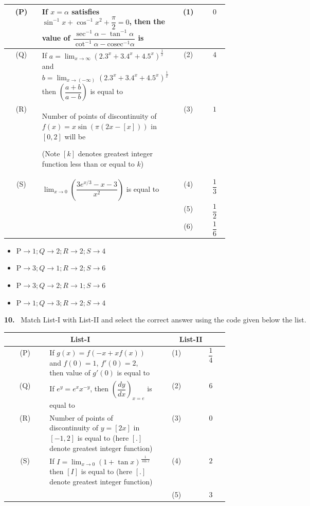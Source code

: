 \documentclass[10pt]{extarticle}
\newcommand{\qn}[1]{\par\smallskip\noindent\textbf{#1.}~}
\newenvironment{qoptions}{\begin{itemize}[leftmargin=1.8em,itemsep=1pt,topsep=2pt,label={}]}{\end{itemize}}
\newcommand{\opt}[2]{\item[(#1)] #2}
\begin{document}
\begin{multicols}{2}
\begin{center}
{\begin{tabular}{|c|p{0.5\linewidth}|c|c|}
(P) & If $x=\alpha$ satisfies $\sin^{-1}x+\cos^{-1}x^2+\dfrac\pi2=0$, then the value of $\dfrac{\sec^{-1}\alpha-\tan^{-1}\alpha}{\cot^{-1}\alpha-\mathrm{cosec}^{-1}\alpha}$ is & (1) & $0$\\\hline
(Q) & If $a=\displaystyle\lim_{x\to\infty}\left(2.3^x+3.4^x+4.5^x\right)^{\frac1x}$ and $b=\displaystyle\lim_{x\to(-\infty)}\left(2.3^x+3.4^x+4.5^x\right)^{\frac1x}$ then $\left(\dfrac{a+b}{a-b}\right)$ is equal to & (2) & $4$\\\hline
(R) & Number of points of discontinuity of $f(x)=x\sin(\pi(2x-[x]))$ in $[0,2]$ will be\par (Note $[k]$ denotes greatest integer function less than or equal to $k$) & (3) & $1$\\\hline
(S) & $\displaystyle\lim_{x\to0}\left(\dfrac{3e^{x/3}-x-3}{x^2}\right)$ is equal to & (4) & $\dfrac13$\\\hline
 & & (5) & $\dfrac12$\\\hline
 & & (6) & $\dfrac16$\\\hline
\end{tabular}}
\end{center}
\begin{qoptions}
\opt{A}{$\mathrm P\to1;Q\to2;R\to2;S\to4$}
\opt{B}{$\mathrm P\to3;Q\to1;R\to2;S\to6$}
\opt{C}{$\mathrm P\to3;Q\to2;R\to1;S\to6$}
\opt{D}{$\mathrm P\to1;Q\to3;R\to2;S\to4$}
\end{qoptions}
\qn{10} Match List-I with List-II and select the correct answer using the code given below the list.
\begin{center}
{\footnotesize\setlength{\tabcolsep}{2pt}\begin{tabular}{|c|p{0.5\linewidth}|c|c|}\hline
\multicolumn{2}{|c|}{List-I} & \multicolumn{2}{c|}{List-II}\\\hline
(P) & If $g(x)=f(-x+xf(x))$ and $f(0)=1$, $f'(0)=2$, then value of $g'(0)$ is equal to & (1) & $\dfrac14$\\\hline
(Q) & If $e^y=e^xx^{-y}$, then $\left(\dfrac{dy}{dx}\right)_{x=e}$ is equal to & (2) & $6$\\\hline
(R) & Number of points of discontinuity of $y=[2x]$ in $[-1,2]$ is equal to (here $[.]$ denote greatest integer function) & (3) & $0$\\\hline
(S) & If $I=\displaystyle\lim_{x\to0}(1+\tan x)^{\frac1{\sin x}}$ then $[I]$ is equal to (here $[.]$ denote greatest integer function) & (4) & $2$\\\hline
 & & (5) & $3$\\\hline
\end{tabular}}

\end{center}
\end{multicols}
\end{document}

